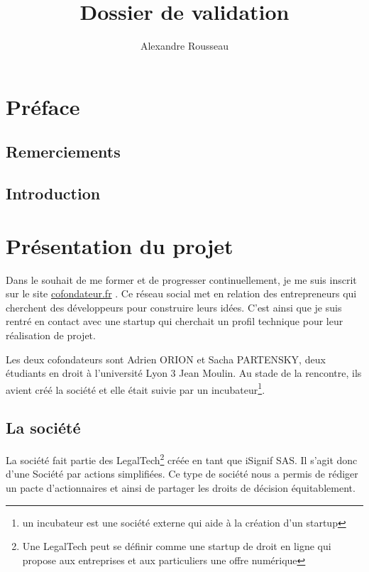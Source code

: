 \documentclass[]{report}
\title{Dossier de validation}
\author{Alexandre Rousseau}
\begin{document}
\maketitle

\newpage

\tableofcontents
\newpage


\chapter{Préface}

  \section{Remerciements}


  \section{Introduction}

\chapter{Présentation du projet}

  Dans le souhait de me former et de progresser continuellement, je me suis inscrit sur le site  \href{https://cofondateur.fr}{cofondateur.fr} . Ce réseau social met en relation des entrepreneurs qui cherchent des développeurs pour construire leurs idées. C'est ainsi que je suis rentré en contact avec une startup qui cherchait un profil technique pour leur réalisation de projet.

  Les deux cofondateurs sont Adrien ORION et Sacha PARTENSKY, deux étudiants en droit à l’université Lyon 3 Jean Moulin. Au stade de la rencontre, ils avient créé la société et elle était suivie par un incubateur\footnote{un incubateur est une société externe qui aide à la création d'un startup}.

  \section{La société}

    La société fait partie des LegalTech\footnote{Une LegalTech peut se définir comme une startup de droit en ligne qui propose aux entreprises et aux particuliers une offre numérique} créée en tant que iSignif SAS. Il s'agit donc d'une Société par actions simplifiées. Ce type de société nous a permis de rédiger un pacte d'actionnaires et ainsi de partager les droits de décision équitablement.
\end{document}
